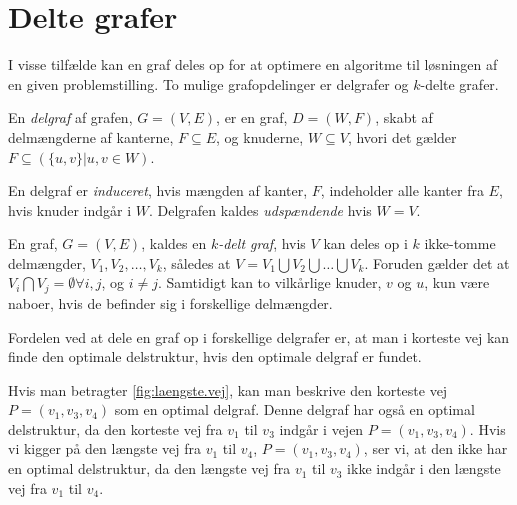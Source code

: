 \section{Delte grafer}
I visse tilfælde kan en graf deles op for at optimere en algoritme til løsningen af en given problemstilling.
To mulige grafopdelinger er delgrafer og $k$-delte grafer.

\begin{defn}[Delgraf] \label{defn:delgraf} %
En \emph{delgraf} af grafen, $G= (V,E)$, er en graf, $D = (W,F)$, skabt af delmængderne af kanterne, $F \subseteq E$, og knuderne, $W \subseteq V$, hvori det gælder $F \subseteq (\{u,v\} | u,v \in W)$.
\end{defn}

En delgraf er \emph{induceret}, hvis mængden af kanter, $F$, indeholder alle kanter fra $E$, hvis knuder indgår i $W$.
Delgrafen kaldes \emph{udspændende} hvis $W=V$. 

\begin{defn} \label{defn:k-delt} %
En graf, $G = (V, E)$, kaldes en \emph{$k$-delt graf}, hvis $V$ kan deles op i $k$ ikke-tomme delmængder, $V_1, V_2,\dotsc, V_k$, således at $V= V_1 \bigcup V_2 \bigcup \dotsc \bigcup V_k$. Foruden gælder det at $V_i \bigcap V_j  = \emptyset \forall i,j$, og $i\neq j$. Samtidigt kan to vilkårlige knuder, $v$ og $u$, kun være naboer, hvis de befinder sig i forskellige delmængder. 
\end{defn}

Fordelen ved at dele en graf op i forskellige delgrafer er, at man i korteste vej kan finde den optimale delstruktur, hvis den optimale delgraf er fundet. 

Hvis man betragter \autoref{fig:laengste.vej}, kan man beskrive den korteste vej $P=(v_1,v_3,v_4)$ som en optimal delgraf. Denne delgraf har også en optimal delstruktur, da den korteste vej fra $v_1$ til $v_3$ indgår i vejen $P=(v_1,v_3,v_4)$.
Hvis vi kigger på den længste vej fra $v_1$ til $v_4$, $P=(v_1,v_3,v_4)$, ser vi, at den ikke har en optimal delstruktur, da den længste vej fra $v_1$ til $v_3$ ikke indgår i den længste vej fra $v_1$ til $v_4$.








